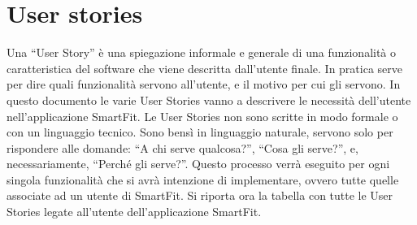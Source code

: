 \documentclass{article}
\begin{document}
   \section{User stories}
   Una “User Story” è una spiegazione informale e generale di una funzionalità o caratteristica del software che viene descritta dall’utente finale. In pratica serve per dire quali funzionalità servono all’utente, e il motivo per cui gli servono.
   In questo documento le varie User Stories vanno a descrivere le necessità dell’utente nell’applicazione SmartFit.
   Le User Stories non sono scritte in modo formale o con un linguaggio tecnico. Sono bensì in linguaggio naturale, servono solo per rispondere alle domande: “A chi serve qualcosa?”, “Cosa gli serve?”, e, necessariamente, “Perché gli serve?”. Questo processo verrà eseguito per ogni singola    funzionalità che si avrà intenzione di implementare, ovvero tutte quelle associate ad un utente di SmartFit.
   Si riporta ora la tabella con tutte le User Stories legate all’utente dell’applicazione SmartFit.
\end{document}

